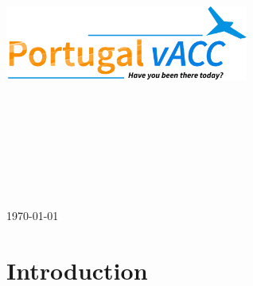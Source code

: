 \documentclass[a4paper,oneside,11pt]{memoir}
\begin{document}
\thispagestyle{empty}

{%

\centering
\Large

~\vspace{\fill}

{\huge
  \textbf{
    \includegraphics[max height=10cm,max width=8cm]{styles/logo.png}\\
    \vspace{1.5cm}
    \MakeUppercase{\docsubject}
}
}

\vspace{2.5cm}

{\LARGE
\MakeUppercase{\doctitle}
}

\vspace{3.5cm}

\coverdesc

\medskip

\vspace{\fill}

\today

}%



\tableofcontents*

\clearpage


\chapter{Introduction}
\end{document}
